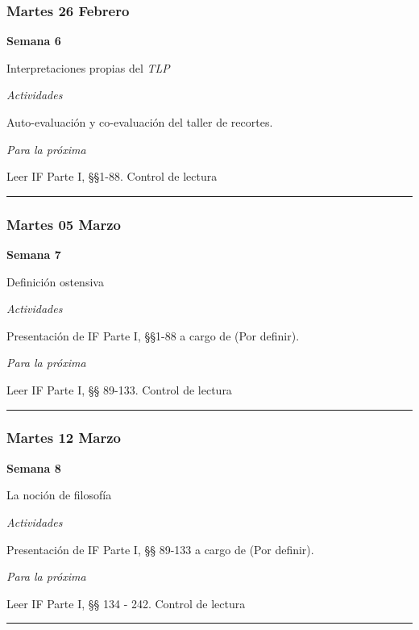 \documentclass[spanish,]{article}
\begin{document}
\subsubsection{Martes 26 Febrero}\label{martes-26-febrero}

\textbf{Semana 6}

Interpretaciones propias del \emph{TLP}

\emph{Actividades}

Auto-evaluación y co-evaluación del taller de recortes.

\emph{Para la próxima}

Leer IF Parte I, §§1-88. Control de lectura

\begin{center}\rule{0.5\linewidth}{\linethickness}\end{center}

\subsubsection{Martes 05 Marzo}\label{martes-05-marzo}

\textbf{Semana 7}

Definición ostensiva

\emph{Actividades}

Presentación de IF Parte I, §§1-88 a cargo de (Por definir).

\emph{Para la próxima}

Leer IF Parte I, §§ 89-133. Control de lectura

\begin{center}\rule{0.5\linewidth}{\linethickness}\end{center}

\subsubsection{Martes 12 Marzo}\label{martes-12-marzo}

\textbf{Semana 8}

La noción de filosofía

\emph{Actividades}

Presentación de IF Parte I, §§ 89-133 a cargo de (Por definir).

\emph{Para la próxima}

Leer IF Parte I, §§ 134 - 242. Control de lectura

\begin{center}\rule{0.5\linewidth}{\linethickness}\end{center}
\end{document}
